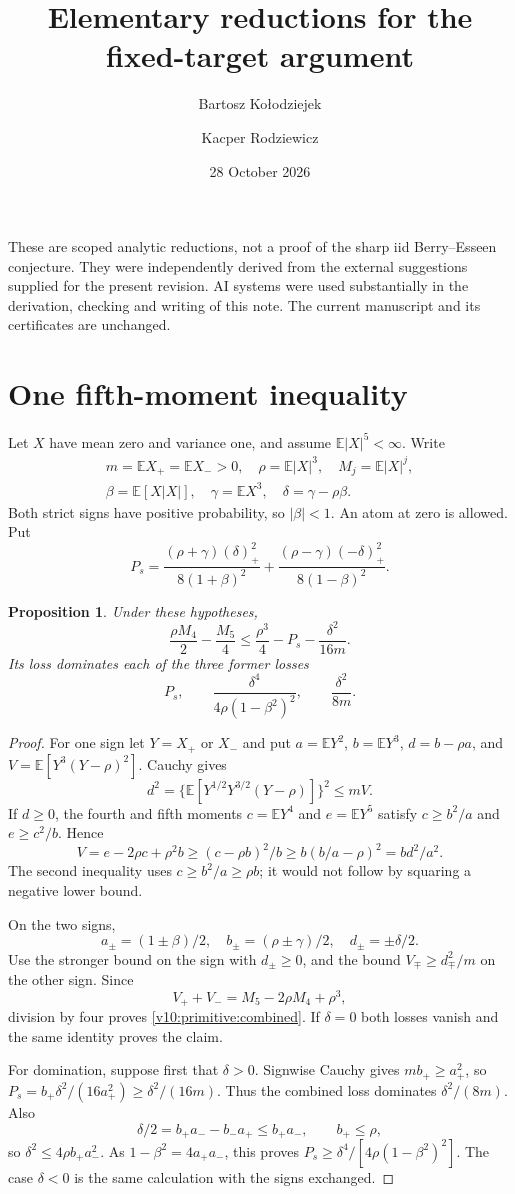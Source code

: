 \documentclass[11pt,a4paper]{article}
\title{Elementary reductions for the fixed-target argument}
\author{Bartosz Ko{\l}odziejek \and Kacper Rodziewicz}
\date{28 October 2026}
\newtheorem{theorem}{Proposition}
\newcommand{\E}{\mathbb E}
\newcommand{\pos}[1]{(#1)_+}
\begin{document}
\maketitle
\noindent These are scoped analytic reductions, not a proof of the sharp
iid Berry--Esseen conjecture. They were independently derived from the
external suggestions supplied for the present revision. AI systems were
used substantially in the derivation, checking and writing of this note.
The current manuscript and its certificates are unchanged.

\section{One fifth-moment inequality}
Let $X$ have mean zero and variance one, and assume $\E|X|^5<\infty$.
Write
\begin{gather*}
 m=\E X_+=\E X_->0,\quad \rho=\E|X|^3,\quad M_j=\E|X|^j,\\
 \beta=\E[X|X|],\quad\gamma=\E X^3,\quad\delta=\gamma-\rho\beta.
\end{gather*}
Both strict signs have positive probability, so $|\beta|<1$.
An atom at zero is allowed. Put
\[
 P_s=\frac{(\rho+\gamma)\pos{\delta}^2}{8(1+\beta)^2}
       +\frac{(\rho-\gamma)\pos{-\delta}^2}{8(1-\beta)^2}.
\]
\begin{theorem}\label{v10:primitive:fifth}
Under these hypotheses,
\begin{equation}\label{v10:primitive:combined}
 \frac{\rho M_4}{2}-\frac{M_5}{4}
 \le \frac{\rho^3}{4}-P_s-\frac{\delta^2}{16m}.
\end{equation}
Its loss dominates each of the three former losses
\[
 P_s,\qquad \frac{\delta^4}{4\rho(1-\beta^2)^2},\qquad
 \frac{\delta^2}{8m}.
\]
\end{theorem}
\begin{proof}
For one sign let $Y=X_+$ or $X_-$ and put
$a=\E Y^2$, $b=\E Y^3$, $d=b-\rho a$, and
$V=\E[Y^3(Y-\rho)^2]$. Cauchy gives
\[
 d^2=\{\E[Y^{1/2}Y^{3/2}(Y-\rho)]\}^2\le mV.
\]
If $d\ge0$, the fourth and fifth moments $c=\E Y^4$ and
$e=\E Y^5$ satisfy $c\ge b^2/a$ and $e\ge c^2/b$. Hence
\[
 V=e-2\rho c+\rho^2b\ge(c-\rho b)^2/b
   \ge b(b/a-\rho)^2=bd^2/a^2.
\]
The second inequality uses $c\ge b^2/a\ge\rho b$; it would not
follow by squaring a negative lower bound.

On the two signs,
\[
 a_\pm=(1\pm\beta)/2,\quad b_\pm=(\rho\pm\gamma)/2,
 \quad d_\pm=\pm\delta/2.
\]
Use the stronger bound on the sign with $d_\pm\ge0$, and the bound
$V_\mp\ge d_\mp^2/m$ on the other sign. Since
\[
 V_++V_-=M_5-2\rho M_4+\rho^3,
\]
division by four proves \eqref{v10:primitive:combined}. If $\delta=0$
both losses vanish and the same identity proves the claim.

For domination, suppose first that $\delta>0$. Signwise Cauchy gives
$mb_+\ge a_+^2$, so $P_s=b_+\delta^2/(16a_+^2)
\ge\delta^2/(16m)$. Thus the combined loss dominates $\delta^2/(8m)$.
Also
\[
 \delta/2=b_+a_--b_-a_+\le b_+a_-,\qquad b_+\le\rho,
\]
so $\delta^2\le4\rho b_+a_-^2$. As $1-\beta^2=4a_+a_-$,
this proves $P_s\ge\delta^4/[4\rho(1-\beta^2)^2]$.
The case $\delta<0$ is the same calculation with the signs exchanged.
\end{proof}
\end{document}
